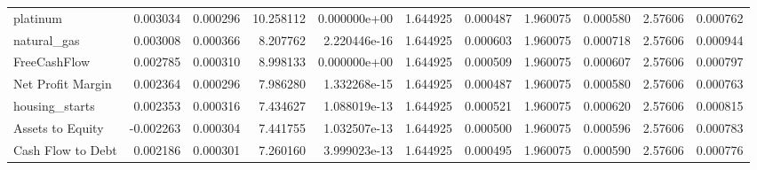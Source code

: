 \documentclass[12pt,a4paper,english]{article}
\begin{document}
{{\begin{tabular}{@{}lrrrrrrrrrr@{}}
			platinum                       & 0.003034                 & 0.000296                    & 10.258112                 & 0.000000e+00                             & 1.644925                      & 0.000487                      & 1.960075                     & 0.000580                     & 2.57606                      & 0.000762                     \\
			natural\_gas                   & 0.003008                 & 0.000366                    & 8.207762                  & 2.220446e-16                             & 1.644925                      & 0.000603                      & 1.960075                     & 0.000718                     & 2.57606                      & 0.000944                     \\
			FreeCashFlow                   & 0.002785                 & 0.000310                    & 8.998133                  & 0.000000e+00                             & 1.644925                      & 0.000509                      & 1.960075                     & 0.000607                     & 2.57606                      & 0.000797                     \\
			Net Profit Margin              & 0.002364                 & 0.000296                    & 7.986280                  & 1.332268e-15                             & 1.644925                      & 0.000487                      & 1.960075                     & 0.000580                     & 2.57606                      & 0.000763                     \\
			housing\_starts                & 0.002353                 & 0.000316                    & 7.434627                  & 1.088019e-13                             & 1.644925                      & 0.000521                      & 1.960075                     & 0.000620                     & 2.57606                      & 0.000815                     \\
			Assets to Equity               & -0.002263                & 0.000304                    & 7.441755                  & 1.032507e-13                             & 1.644925                      & 0.000500                      & 1.960075                     & 0.000596                     & 2.57606                      & 0.000783                     \\
			Cash Flow to Debt              & 0.002186                 & 0.000301                    & 7.260160                  & 3.999023e-13                             & 1.644925                      & 0.000495                      & 1.960075                     & 0.000590                     & 2.57606                      & 0.000776                     \\

\end{tabular}}}
\end{document}
